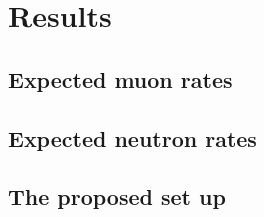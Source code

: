 \section{Results}
\label{sec:res}
\subsection{Expected muon rates}
\subsection{Expected neutron rates}
\subsection{The proposed set up}